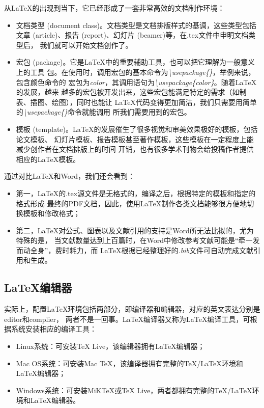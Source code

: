 从LaTeX的出现到当下，它已经形成了一套非常高效的文档制作环境：
\begin{itemize}
      \item 文档类型 (document class)。文档类型是文档排版样式的基调，这些类型包括
            文章 (article)、报告 (report)、幻灯片 (beamer)等，在.tex文件中申明文档类型后，
            我们就可以开始文档创作了。
      \item 宏包 (package)。它是LaTeX中的重要辅助工具，也可以把它理解为一般意义上的工具
            包。在使用时，调用宏包的基本命令为\emph{\textbackslash usepackage\{\}}，举例来说，包含颜色命令的
            宏包为\emph{color}，其调用语句为\emph{\textbackslash usepackage\{color\}}。随着LaTeX的发展，越来
            越多的宏包被开发出来，这些宏包能满足特定的需求（如制表、插图、绘图），同时也能让
            LaTeX代码变得更加简洁，我们只需要用简单的\emph{\textbackslash usepackage\{\}}命令就能调用
            所我们需要用到的宏包。
      \item 模板 (template)。LaTeX的发展催生了很多视觉和审美效果极好的模板，包括论文模板、
            幻灯片模板、报告模板甚至著作模板，这些模板在一定程度上能减少创作者在文档排版上的时间
            开销，也有很多学术刊物会给投稿作者提供相应的LaTeX模板。
\end{itemize}

通过对比LaTeX和Word，我们还会看到：
\begin{itemize}
      \item 第一，LaTeX的.tex源文件是无格式的，编译之后，根据特定的模板和指定的格式形成
            最终的PDF文档，因此，使用LaTeX制作各类文档能够很方便地切换模板和修改格式；
      \item 第二，LaTeX对公式、图表以及文献引用的支持是Word所无法比拟的，尤为特殊的是，
            当文献数量达到上百篇时，在Word中修改参考文献可能是“牵一发而动全身”，费时耗力，而
            LaTeX根据已经整理好的\emph{.bib}文件可自动完成文献引用和生成。
\end{itemize}

\subsection{\LaTeX 编辑器}
实际上，配置LaTeX环境包括两部分，即编译器和编辑器，对应的英文表达分别是editor和complier，
两者不是一回事。LaTeX编译器又称为LaTeX编译工具，可根据系统安装相应的编译工具：
\begin{itemize}
      \item Linux系统：可安装TeX Live，该编辑器拥有LaTeX编辑器；
      \item Mac OS系统：可安装Mac TeX，该编译器拥有完整的TeX/LaTeX环境和LaTeX编辑器；
      \item Windows系统：可安装MiKTeX或TeX Live，两者都拥有完整的TeX/LaTeX环境和LaTeX编辑器。
\end{itemize}

